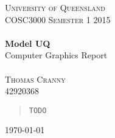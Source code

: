 \begin{titlepage}
    \vspace*{1cm}
    \begin{center}

        \textsc{\LARGE University of Queensland}\\[1.5cm]

        \textsc{\Large COSC3000 Semester 1 2015}\\[0.5cm]

        \HRule \\[0.4cm]
        { \huge{ \bfseries Model UQ}\\ Computer Graphics Report \\[0.4cm] }
        \HRule \\[0.5cm]

        \vspace*{5mm}
        \textsc{\Large Thomas Cranny}\\[0.5cm]
        42920368
        \vspace*{1cm}

        \begin{abstract}
            \texttt{TODO}
        \end{abstract}

        \vfill
        {\large \today}

    \end{center}
\end{titlepage}

\tableofcontents